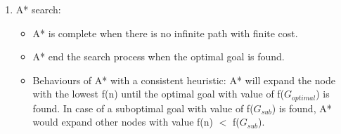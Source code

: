 \documentclass[a4paper, 12pt]{article}
\begin{document}
\begin{enumerate}
	\item A* search:
	\begin{itemize}
		\item A* is complete when there is no infinite path with finite cost.
		\item A* end the search process when the optimal goal is found.
		\item Behaviours of A* with a consistent heuristic: A* will expand the node with the lowest f(n) until the optimal goal with value of f($G_{optimal}$) is found. In case of a suboptimal goal with value of f($G_{sub}$) is found, A* would expand other nodes with value f(n) $<$ f($G_{sub}$).
	\end{itemize}
	
    \end{enumerate}
\end{document}

